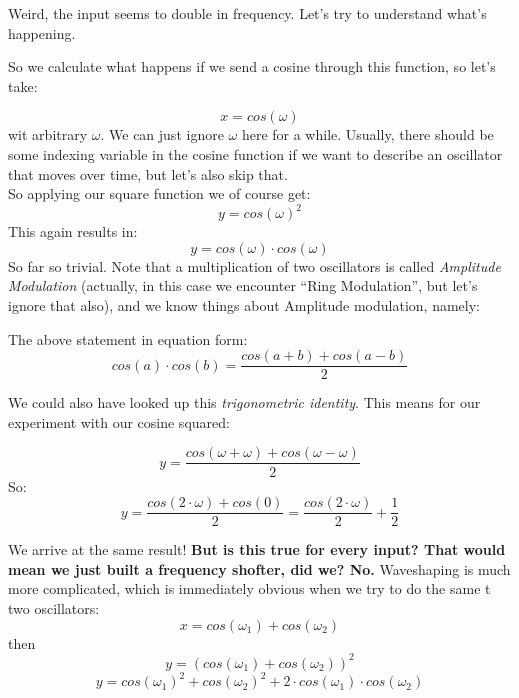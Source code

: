 Weird, the input seems to double in frequency. Let's try to understand what's happening.\

So we calculate what happens if we send a cosine through this function, so let's take:

\begin{equation}
x = cos(\omega)
\end{equation}
wit arbitrary $\omega$. We can just ignore $\omega$ here for a while. Usually, there should be some indexing variable in the cosine function if we want to describe an oscillator that moves over time, but let's also skip that.\\
So applying our square function we of course get:
\begin{equation}
y = cos(\omega)^2
\end{equation}
This again results in:
\begin{equation}
y = cos(\omega) \cdot cos(\omega)
\end{equation}
So far so trivial. Note that a multiplication of two oscillators is called \textit{Amplitude Modulation} (actually, in this case we encounter ``Ring Modulation'', but let's ignore that also), and we know things about Amplitude modulation, namely:\

The above statement in equation form:
\begin{equation}
	cos(a)\cdot cos(b) = \frac{cos(a+b) + cos(a-b)}{2}
\end{equation}

We could also have looked up this \textit{trigonometric identity}.
This means for our experiment with our cosine squared:

\begin{equation}
y = \frac{cos(\omega+\omega) + cos(\omega-\omega)}{2}
\end{equation}
So:
\begin{equation}
y = \frac{cos(2 \cdot \omega) + cos(0)}{2} = \frac{cos(2 \cdot \omega )}{2}+\frac{1}{2}
\end{equation}

We arrive at the same result!
\textbf{But is this true for every input? That would mean we just built a frequency shofter, did we? No.} Waveshaping is much more complicated, which is immediately obvious when we try to do the same t two oscillators:
\begin{equation}
x = cos(\omega_1)+cos(\omega_2)
\end{equation}
then
\begin{equation}
y = (cos(\omega_1)+cos(\omega_2) ) ^2
\end{equation}
\begin{equation}
y = cos(\omega_1)^2+cos(\omega_2)^2+2\cdot cos(\omega_1) \cdot cos(\omega_2)
\end{equation}

